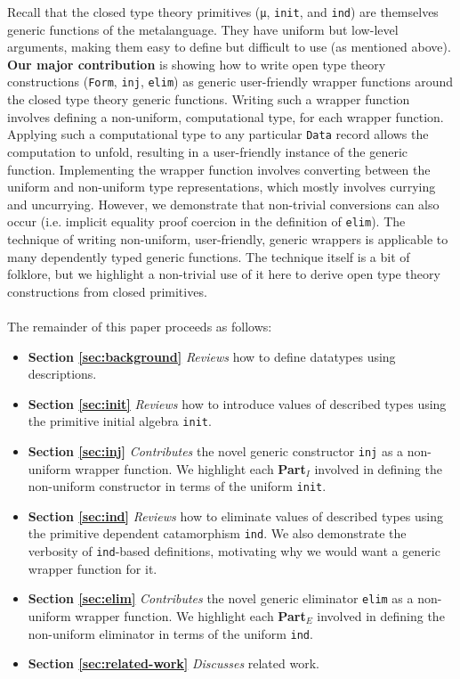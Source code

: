 \documentclass[preprint,nonatbib]{sigplanconf}
\newcommand{\refsec}[1]{Section \ref{sec:#1}}
\begin{document}
Recall that the closed type theory primitives ({\tt μ}, {\tt init},
and {\tt ind}) are themselves generic functions of the metalanguage.
They have uniform but low-level arguments, making them easy to define
but difficult to use (as mentioned above).
{\bf Our major contribution} is showing how to write open type theory
constructions ({\tt Form}, {\tt inj}, {\tt elim}) as generic
user-friendly wrapper functions around the closed type theory generic
functions. Writing such a wrapper function involves defining a
non-uniform, computational type, for each wrapper function. Applying
such a computational type to any particular {\tt Data} record allows
the computation to unfold, resulting in a user-friendly instance of
the generic function. Implementing the wrapper function involves
converting between the uniform and non-uniform type representations,
which mostly involves currying and uncurrying. However, we demonstrate
that non-trivial conversions can also occur (i.e. implicit equality
proof coercion in the definition of {\tt elim}). The technique of
writing non-uniform, user-friendly, generic wrappers is applicable to
many dependently typed generic functions. The technique
itself is a bit of folklore, but we highlight a
non-trivial use of it here to derive open type theory constructions
from closed primitives.

\paragraph{}
The remainder of this paper proceeds as follows:

\begin{itemize}
\item{\bf{\refsec{background}}}
{\it Reviews} how to define datatypes using descriptions.

\item{\bf{\refsec{init}}}
{\it Reviews} how to introduce values of described types using the
primitive initial algebra {\tt init}.

\item{\bf{\refsec{inj}}}
{\it Contributes} the novel generic constructor {\tt inj} as a
non-uniform wrapper function. We highlight each {\bf Part$_I$} involved in defining the
non-uniform constructor in terms of the uniform {\tt init}.

\item{\bf{\refsec{ind}}}
{\it Reviews} how to eliminate values of described types using the
primitive dependent catamorphism {\tt ind}. We also demonstrate
the verbosity of {\tt ind}-based definitions, motivating why we would
want a generic wrapper function for it.

\item{\bf{\refsec{elim}}}
{\it Contributes} the novel generic eliminator {\tt elim} as a
non-uniform wrapper function. We
highlight each {\bf Part$_E$} involved in defining the non-uniform
eliminator in terms of the uniform {\tt ind}.

\item{\bf{\refsec{related-work}}}
{\it Discusses} related work.

\end{itemize}
\end{document}
